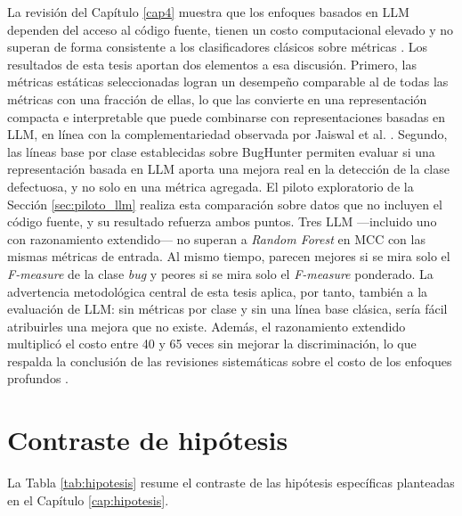 La revisión del Capítulo \ref{cap4} muestra que los enfoques basados en LLM dependen del acceso al código fuente, tienen un costo computacional elevado y no superan de forma consistente a los clasificadores clásicos sobre métricas \cite{giray2023,stradowski2023,monteiro2026jit}. Los resultados de esta tesis aportan dos elementos a esa discusión. Primero, las métricas estáticas seleccionadas logran un desempeño comparable al de todas las métricas con una fracción de ellas, lo que las convierte en una representación compacta e interpretable que puede combinarse con representaciones basadas en LLM, en línea con la complementariedad observada por Jaiswal et al. \cite{jaiswal2026llm}. Segundo, las líneas base por clase establecidas sobre BugHunter permiten evaluar si una representación basada en LLM aporta una mejora real en la detección de la clase defectuosa, y no solo en una métrica agregada. El piloto exploratorio de la Sección \ref{sec:piloto_llm} realiza esta comparación sobre datos que no incluyen el código fuente, y su resultado refuerza ambos puntos. Tres LLM ---incluido uno con razonamiento extendido--- no superan a \textit{Random Forest} en MCC con las mismas métricas de entrada. Al mismo tiempo, parecen mejores si se mira solo el \textit{F-measure} de la clase \textit{bug} y peores si se mira solo el \textit{F-measure} ponderado. La advertencia metodológica central de esta tesis aplica, por tanto, también a la evaluación de LLM: sin métricas por clase y sin una línea base clásica, sería fácil atribuirles una mejora que no existe. Además, el razonamiento extendido multiplicó el costo entre 40 y 65 veces sin mejorar la discriminación, lo que respalda la conclusión de las revisiones sistemáticas sobre el costo de los enfoques profundos \cite{giray2023,stradowski2023}.

\section{Contraste de hipótesis}

La Tabla \ref{tab:hipotesis} resume el contraste de las hipótesis específicas planteadas en el Capítulo \ref{cap:hipotesis}.

